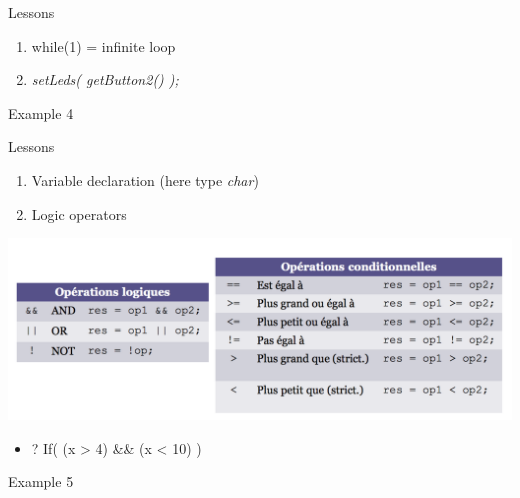 \begin{frame}{Lessons}

\begin{enumerate}
\def\labelenumi{\arabic{enumi}.}
\tightlist
\item
  while(1) = infinite loop
\item
  \emph{setLeds( getButton2() );}
\end{enumerate}

\end{frame}

\begin{frame}{Example 4}



\end{frame}

\begin{frame}{Lessons}

\begin{enumerate}
\def\labelenumi{\arabic{enumi}.}
\tightlist
\item
  Variable declaration (here type \emph{char})
\item
  Logic operators
\end{enumerate}

\begin{center}
\includegraphics[width=1\textwidth]{images/logique.png}
\end{center}

\begin{itemize}
\tightlist
\item
  ? If( (x \textgreater{} 4) \&\& (x \textless{} 10) )
\end{itemize}

\end{frame}

\begin{frame}{Example 5}



\end{frame}

